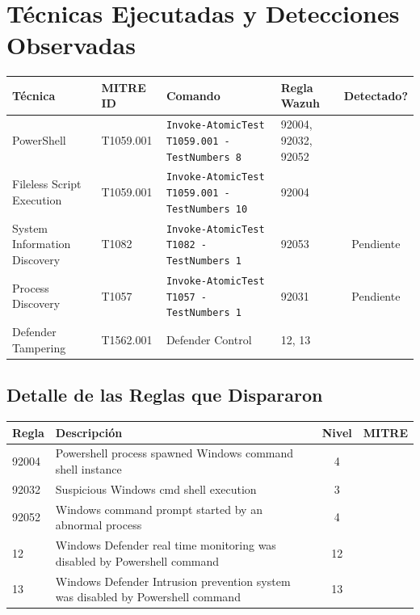 \documentclass[11pt,a4paper]{article}
\begin{document}
	\newpage
	
	\section{Técnicas Ejecutadas y Detecciones Observadas}
	
	\begin{table}[h]
		\centering
		\begin{tabular}{@{}p{3.5cm}p{2cm}p{3.3cm}p{1.5cm}c@{}}
			\toprule
			\textbf{Técnica} & \textbf{MITRE ID} & \textbf{Comando} & \textbf{Regla Wazuh} & \textbf{Detectado?} \\ \midrule
			PowerShell & T1059.001 & \texttt{Invoke-AtomicTest T1059.001 -TestNumbers 8} & 92004, 92032, 92052 & \textcolor{purplegreen}{\checkmark} \\
			Fileless Script Execution & T1059.001 & \texttt{Invoke-AtomicTest T1059.001 -TestNumbers 10} & 92004 & \textcolor{purplegreen}{\checkmark} \\
			System Information Discovery & T1082 & \texttt{Invoke-AtomicTest T1082 -TestNumbers 1} & 92053 & Pendiente \\
			Process Discovery & T1057 & \texttt{Invoke-AtomicTest T1057 -TestNumbers 1} & 92031 & Pendiente \\
			Defender Tampering & T1562.001 & Defender Control & 12, 13 & \textcolor{purplegreen}{\checkmark} \\
			\bottomrule
		\end{tabular}
	\end{table}
	
	\subsection{Detalle de las Reglas que Dispararon}
	
	\begin{table}[h]
		\centering
		\begin{tabular}{@{}p{1.5cm}p{8.5cm}c c@{}}
			\toprule
			\textbf{Regla} & \textbf{Descripción} & \textbf{Nivel} & \textbf{MITRE} \\ \midrule
			92004 & Powershell process spawned Windows command shell instance & 4 & \textcolor{purplegreen}{\checkmark} \\
			92032 & Suspicious Windows cmd shell execution & 3 & \textcolor{purplegreen}{\checkmark} \\
			92052 & Windows command prompt started by an abnormal process & 4 & \textcolor{purplegreen}{\checkmark} \\
			12 & Windows Defender real time monitoring was disabled by Powershell command & 12 & \textcolor{purplegreen}{\checkmark} \\
			13 & Windows Defender Intrusion prevention system was disabled by Powershell command & 13 & \textcolor{purplegreen}{\checkmark} \\
			\bottomrule
		\end{tabular}
	\end{table}
	
\end{document}
